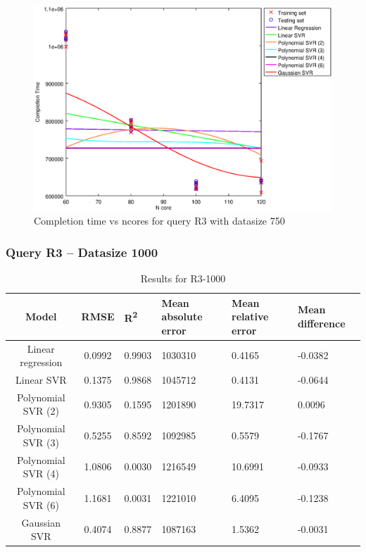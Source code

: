 \documentclass[a4paper,11pt]{article}
\begin{document}
\begin {figure}[hbtp]
\centering
\includegraphics[width=\textwidth]{output/R3_750_LINEAR_NCORE/plot_R3_750.eps}
\caption{Completion time vs ncores for query R3 with datasize 750}
\label{fig:all_linear_R3_750}
\end {figure}

\newpage
\subsubsection{Query R3 -- Datasize 1000}
\begin{table}[H]
	\centering
	\begin{adjustbox}{center}
		\begin{tabular}{c | c M{1.2cm} M{2.5cm} M{2.5cm} M{1.8cm}}
			Model & RMSE & R\textsuperscript{2} & Mean absolute error & Mean relative error & Mean difference \tabularnewline
			\hline
			Linear regression & 0.0992 & 0.9903 & 1030310 & 0.4165 & -0.0382 \\
			Linear SVR & 0.1375 & 0.9868 & 1045712 & 0.4131 & -0.0644 \\
			Polynomial SVR (2) & 0.9305 & 0.1595 & 1201890 & 19.7317 & 0.0096 \\
			Polynomial SVR (3) & 0.5255 & 0.8592 & 1092985 & 0.5579 & -0.1767 \\
			Polynomial SVR (4) & 1.0806 & 0.0030 & 1216549 & 10.6991 & -0.0933 \\
			Polynomial SVR (6) & 1.1681 & 0.0031 & 1221010 & 6.4095 & -0.1238 \\
			Gaussian SVR & 0.4074 & 0.8877 & 1087163 & 1.5362 & -0.0031 \\
		\end{tabular}
	\end{adjustbox}
	\\
	\caption{Results for R3-1000}
	\label{fig:all_linear_R3_1000}
\end{table}
\end{document}
